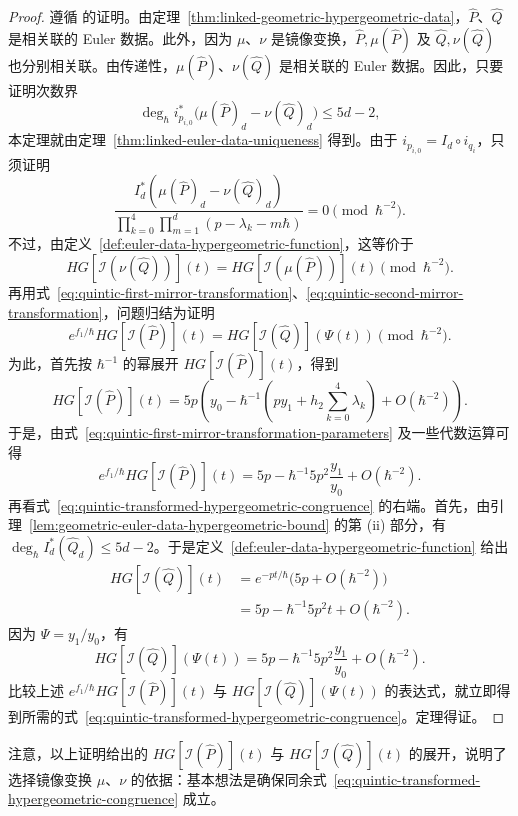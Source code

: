 \begin{proof}
遵循  的证明。由定理~\ref{thm:linked-geometric-hypergeometric-data}，$\widehat P$、$\widehat Q$ 是相关联的 Euler 数据。此外，因为 $\mu$、$\nu$ 是镜像变换，$\widehat P,\mu(\widehat P)$ 及 $\widehat Q,\nu(\widehat Q)$ 也分别相关联。由传递性，$\mu(\widehat P)$、$\nu(\widehat Q)$ 是相关联的 Euler 数据。因此，只要证明次数界
\[
\deg_{\hbar}i_{p_{i,0}}^*\bigl(\mu(\widehat P)_d-\nu(\widehat Q)_d\bigr)\le5d-2,
\]
本定理就由定理~\ref{thm:linked-euler-data-uniqueness} 得到。由于 $i_{p_{i,0}}=I_d\circ i_{q_i}$，只须证明
\[
\frac{I_d^*(\mu(\widehat P)_d-\nu(\widehat Q)_d)}
{\prod_{k=0}^4\prod_{m=1}^d(p-\lambda_k-m\hbar)}
=0\pmod{\hbar^{-2}}.
\]
不过，由定义~\ref{def:euler-data-hypergeometric-function}，这等价于
\[
HG[\mathcal I(\nu(\widehat Q))](t)
=HG[\mathcal I(\mu(\widehat P))](t)\pmod{\hbar^{-2}}.
\]
再用式~\eqref{eq:quintic-first-mirror-transformation}、\eqref{eq:quintic-second-mirror-transformation}，问题归结为证明
\begin{equation}\label{eq:quintic-transformed-hypergeometric-congruence}
e^{f_1/\hbar}HG[\mathcal I(\widehat P)](t)
=HG[\mathcal I(\widehat Q)](\Psi(t))\pmod{\hbar^{-2}}.
\end{equation}
为此，首先按 $\hbar^{-1}$ 的幂展开 $HG[\mathcal I(\widehat P)](t)$，得到
\[
HG[\mathcal I(\widehat P)](t)
=5p\left(y_0-\hbar^{-1}\left(py_1+h_2\sum_{k=0}^4\lambda_k\right)+O(\hbar^{-2})\right).
\]
于是，由式~\eqref{eq:quintic-first-mirror-transformation-parameters} 及一些代数运算可得
\[
e^{f_1/\hbar}HG[\mathcal I(\widehat P)](t)
=5p-\hbar^{-1}5p^2\frac{y_1}{y_0}+O(\hbar^{-2}).
\]
再看式~\eqref{eq:quintic-transformed-hypergeometric-congruence} 的右端。首先，由引理~\ref{lem:geometric-euler-data-hypergeometric-bound} 的第 (ii) 部分，有 $\deg_{\hbar}I_d^*(\widehat Q_d)\le5d-2$。于是定义~\ref{def:euler-data-hypergeometric-function} 给出
\[
\begin{aligned}
HG[\mathcal I(\widehat Q)](t)
&=e^{-pt/\hbar}\bigl(5p+O(\hbar^{-2})\bigr)\\
&=5p-\hbar^{-1}5p^2t+O(\hbar^{-2}).
\end{aligned}
\]
因为 $\Psi=y_1/y_0$，有
\[
HG[\mathcal I(\widehat Q)](\Psi(t))
=5p-\hbar^{-1}5p^2\frac{y_1}{y_0}+O(\hbar^{-2}).
\]
比较上述 $e^{f_1/\hbar}HG[\mathcal I(\widehat P)](t)$ 与 $HG[\mathcal I(\widehat Q)](\Psi(t))$ 的表达式，就立即得到所需的式~\eqref{eq:quintic-transformed-hypergeometric-congruence}。定理得证。
\end{proof}
注意，以上证明给出的 $HG[\mathcal I(\widehat P)](t)$ 与 $HG[\mathcal I(\widehat Q)](t)$ 的展开，说明了选择镜像变换 $\mu$、$\nu$ 的依据：基本想法是确保同余式~\eqref{eq:quintic-transformed-hypergeometric-congruence} 成立。
